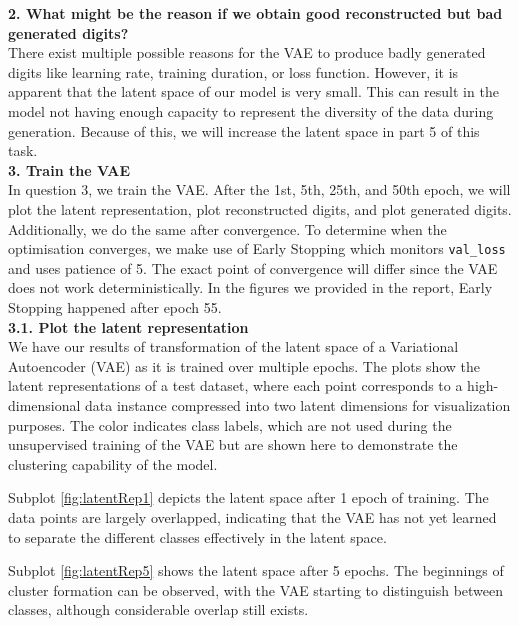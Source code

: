 \textbf{2. What might be the reason if we obtain good reconstructed but bad generated digits?} \\

There exist multiple possible reasons for the VAE to produce badly generated digits like learning rate, training duration, or loss function. However, it is apparent that the latent space of our model is very small. This can result in the model not having enough capacity to represent the diversity of the data during generation. Because of this, we will increase the latent space in part 5 of this task. \\

\textbf{3. Train the VAE} \\

In question 3, we train the VAE. After the 1st, 5th, 25th, and 50th epoch, we will plot the latent representation, plot reconstructed digits, and plot generated digits. Additionally, we do the same after convergence. To determine when the optimisation converges, we make use of Early Stopping which monitors \texttt{val\_loss} and uses patience of 5. The exact point of convergence will differ since the VAE does not work deterministically. In the figures we provided in the report, Early Stopping happened after epoch 55. \\

\textbf{3.1. Plot the latent representation} \\

We have our results of transformation of the latent space of a Variational Autoencoder (VAE) as it is trained over multiple epochs. The plots show the latent representations of a test dataset, where each point corresponds to a high-dimensional data instance compressed into two latent dimensions for visualization purposes. The color indicates class labels, which are not used during the unsupervised training of the VAE but are shown here to demonstrate the clustering capability of the model.

Subplot \ref{fig:latentRep1} depicts the latent space after 1 epoch of training. The data points are largely overlapped, indicating that the VAE has not yet learned to separate the different classes effectively in the latent space.

Subplot \ref{fig:latentRep5} shows the latent space after 5 epochs. The beginnings of cluster formation can be observed, with the VAE starting to distinguish between classes, although considerable overlap still exists.

